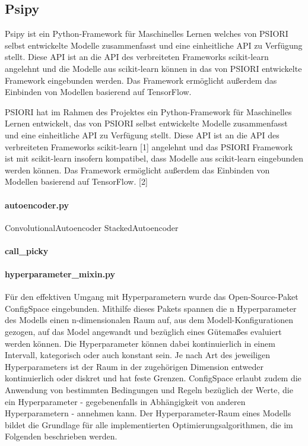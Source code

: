 		
		\subsection{Psipy}
		\label{subsec:Psipy}
			Psipy ist ein Python-Framework für Maschinelles Lernen welches von PSIORI selbst entwickelte Modelle zusammenfasst und eine einheitliche API zu Verfügung stellt. Diese API ist an die API des verbreiteten Frameworks scikit-learn angelehnt und die Modelle aus scikit-learn können in das von PSIORI entwickelte Framework eingebunden werden. Das Framework ermöglicht außerdem das Einbinden von Modellen basierend auf TensorFlow.\grqq [PSIORI]
			
			PSIORI hat im Rahmen des Projektes ein Python-Framework für Maschinelles Lernen entwickelt, das von PSIORI selbst entwickelte Modelle zusammenfasst und eine einheitliche API zu Verfügung stellt. Diese API ist an die API des verbreiteten Frameworks scikit-learn [1] angelehnt und das PSIORI Framework ist mit scikit-learn insofern kompatibel, dass Modelle aus scikit-learn eingebunden werden können. Das Framework ermöglicht außerdem das Einbinden von Modellen basierend auf TensorFlow. [2]
			
		\paragraph{autoencoder.py}
			ConvolutionalAutoencoder 
			StackedAutoencoder
		\paragraph{call\_picky}
		\paragraph{hyperparameter\_mixin.py} 
			\cite{Lindauer.}
		
		Für den effektiven Umgang mit Hyperparametern wurde das Open-Source-Paket ConfigSpace 	\cite{Lindauer.} eingebunden. Mithilfe dieses Pakets spannen die n Hyperparameter des Modells einen n-dimensionalen Raum auf, aus dem Modell-Konfigurationen gezogen, auf das Model angewandt und bezüglich eines Gütemaßes evaluiert werden können. Die Hyperparameter können dabei kontinuierlich in einem Intervall, kategorisch oder auch konstant sein. Je nach Art des jeweiligen Hyperparameters ist der Raum in der zugehörigen Dimension entweder kontinuierlich oder diskret und hat feste Grenzen. ConfigSpace erlaubt zudem die Anwendung von bestimmten Bedingungen und Regeln bezüglich der Werte, die ein Hyperparameter - gegebenenfalls in Abhängigkeit von anderen Hyperparametern - annehmen kann. Der Hyperparameter-Raum eines Modells bildet die Grundlage für alle implementierten Optimierungsalgorithmen, die im Folgenden beschrieben werden.
		
